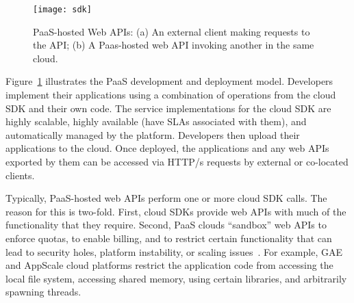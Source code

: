 
\begin{figure}
\centering
\texttt{[image: sdk]}
\caption{PaaS-hosted Web APIs: (a) An external client making requests
to the API;
(b) A Paas-hosted web API invoking another in the same cloud.
\label{fig:cloud_app_model}
}
\vspace{-0.2in}
\end{figure}

Figure~\ref{fig:cloud_app_model} illustrates the PaaS development and deployment model.
Developers implement their applications using a combination of operations
from the cloud SDK and their own code.  The service implementations for the 
cloud SDK are highly scalable, highly available (have SLAs associated with them),
and automatically managed by the platform. Developers then
upload their applications to the cloud.
Once deployed, the applications and any web APIs exported by them can be accessed 
via HTTP/s requests by external or co-located clients.

Typically, PaaS-hosted web APIs perform one or more
cloud SDK calls.  The reason for this is two-fold.  First, 
cloud SDKs provide web APIs with much of the functionality that they require.
Second, PaaS clouds ``sandbox'' web APIs to enforce quotas, to enable billing,
and to restrict certain functionality
that can lead to security holes, platform instability, or scaling issues~\cite{gae-sandbox}.
For example, GAE and AppScale cloud platforms restrict the application code
from accessing the local file system, accessing shared memory, using certain libraries,
and arbitrarily spawning threads.


